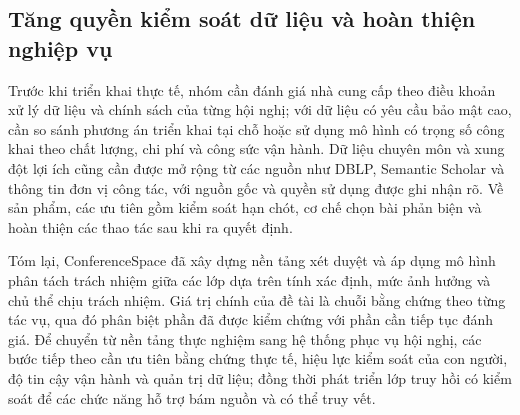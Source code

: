 \subsection{Tăng quyền kiểm soát dữ liệu và hoàn thiện nghiệp vụ}

Trước khi triển khai thực tế, nhóm cần đánh giá nhà cung cấp theo điều khoản xử lý dữ liệu và chính sách của từng hội nghị; với dữ liệu có yêu cầu bảo mật cao, cần so sánh phương án triển khai tại chỗ hoặc sử dụng mô hình có trọng số công khai theo chất lượng, chi phí và công sức vận hành. Dữ liệu chuyên môn và xung đột lợi ích cũng cần được mở rộng từ các nguồn như DBLP, Semantic Scholar và thông tin đơn vị công tác, với nguồn gốc và quyền sử dụng được ghi nhận rõ. Về sản phẩm, các ưu tiên gồm kiểm soát hạn chót, cơ chế chọn bài phản biện và hoàn thiện các thao tác sau khi ra quyết định.

Tóm lại, ConferenceSpace đã xây dựng nền tảng xét duyệt và áp dụng mô hình phân tách trách nhiệm giữa các lớp dựa trên tính xác định, mức ảnh hưởng và chủ thể chịu trách nhiệm. Giá trị chính của đề tài là chuỗi bằng chứng theo từng tác vụ, qua đó phân biệt phần đã được kiểm chứng với phần cần tiếp tục đánh giá. Để chuyển từ nền tảng thực nghiệm sang hệ thống phục vụ hội nghị, các bước tiếp theo cần ưu tiên bằng chứng thực tế, hiệu lực kiểm soát của con người, độ tin cậy vận hành và quản trị dữ liệu; đồng thời phát triển lớp truy hồi có kiểm soát để các chức năng hỗ trợ bám nguồn và có thể truy vết.
